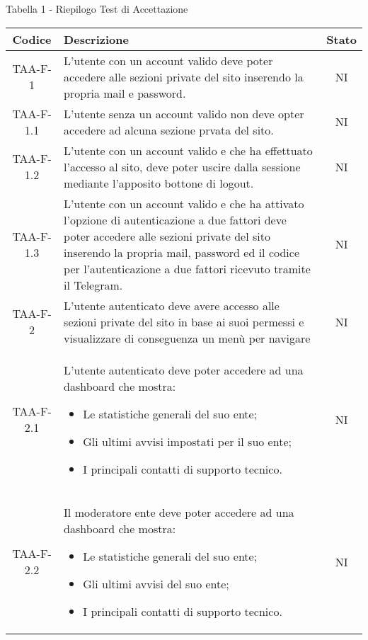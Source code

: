 		\begin{center}
		Tabella 1 - Riepilogo Test di Accettazione
			\begin{longtable}{|c|p{10cm}|c|}
			\hline
			\rowcolor{lighter-grayer}
			\textbf{Codice} & \textbf{Descrizione} & \textbf{Stato} \\
			\hline
			\endhead

			\hline
			 TAA-F-1 & L'utente con un account valido deve poter accedere alle sezioni private del sito inserendo la propria mail e password.
			  & NI \\
			 \hline
			 TAA-F-1.1 & L'utente senza un account valido non deve opter accedere ad alcuna sezione prvata del sito. & NI \\
			 \hline
			 TAA-F-1.2 & L'utente con un account valido e che ha effettuato l'accesso al sito, deve poter uscire dalla sessione mediante l'apposito bottone di logout. & NI \\
			 \hline
			 TAA-F-1.3 & L'utente con un account valido e che ha attivato l'opzione di autenticazione a due fattori deve poter accedere alle sezioni private del sito inserendo la propria mail, password ed il codice per l'autenticazione a due fattori ricevuto tramite il Telegram. & NI \\
			 \hline
			 TAA-F-2 & L'utente autenticato deve avere accesso alle sezioni private del sito in base ai suoi permessi e visualizzare di conseguenza un menù per navigare & NI \\
			 \hline
			 TAA-F-2.1 & L'utente autenticato deve poter accedere ad una dashboard che mostra:
			 \begin{itemize}
			 	\item Le statistiche generali del suo ente;
			 	\item Gli ultimi avvisi impostati per il suo ente;
			 	\item I principali contatti di supporto tecnico.
			 \end{itemize} & NI \\
			 \hline
			 TAA-F-2.2 & Il moderatore ente deve poter accedere ad una dashboard che mostra:
			 \begin{itemize}
			 	\item Le statistiche generali del suo ente;
			 	\item Gli ultimi avvisi del suo ente;
			 	\item I principali contatti di supporto tecnico.
			 \end{itemize} & NI \\

\end{longtable}
\end{center}
